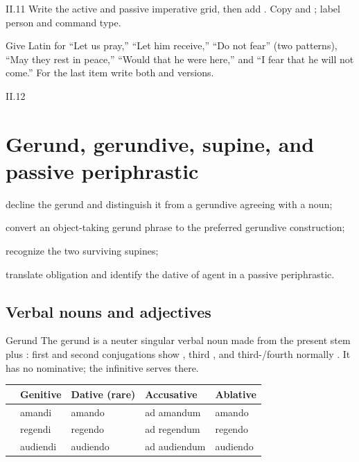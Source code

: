 \begin{courseunit}{II.11}
Write the active and passive imperative grid, then add .  Copy
 and ; label person and command type.

Give Latin for ``Let us pray,'' ``Let him receive,'' ``Do not fear'' (two patterns), ``May
they rest in peace,'' ``Would that he were here,'' and ``I fear that he will not come.''  For
the last item write both  and  versions.



\end{courseunit}

\begin{courseunit}{II.12}
\chapter{Gerund, gerundive, supine, and passive periphrastic}

\begin{learningobjectives}
  \item decline the gerund and distinguish it from a gerundive agreeing with a noun;
  \item convert an object-taking gerund phrase to the preferred gerundive construction;
  \item recognize the two surviving supines;
  \item translate obligation and identify the dative of agent in a passive periphrastic.
\end{learningobjectives}

\section{Verbal nouns and adjectives}

\begin{grammarbox}{Gerund}
The gerund is a neuter singular verbal noun made from the present stem plus
: first and second conjugations show , third ,
and third-/fourth normally .  It has no nominative; the infinitive
serves there.

\begin{center}
\begin{tabular}{@{}lllll@{}}
\toprule
& Genitive & Dative (rare) & Accusative & Ablative\\ \midrule
\Latin{amo} & amandi & amando & ad amandum & amando\\
\Latin{rego} & regendi & regendo & ad regendum & regendo\\
\Latin{audio} & audiendi & audiendo & ad audiendum & audiendo\\
\bottomrule
\end{tabular}
\end{center}


\end{grammarbox}
\end{courseunit}
